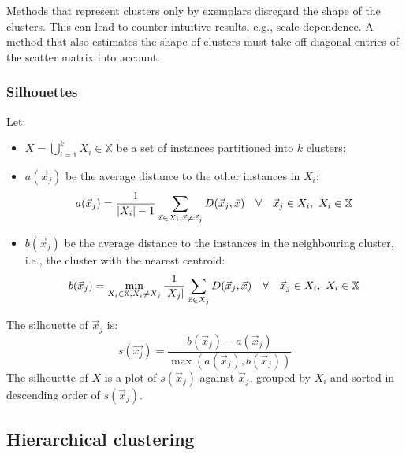 Methods that represent clusters only by exemplars disregard the shape of the
clusters.
This can lead to counter-intuitive results, e.g., scale-dependence.
A method that also estimates the shape of clusters must take off-diagonal
entries of the scatter matrix into account.

\subsubsection{Silhouettes}

\begin{dfn}
  [Silhouette]
  Let:
  \begin{itemize}
    \item $X = \bigcup_{i = 1}^{k} X_i \in \mathbb{X}$ be a set of instances
          partitioned into $k$ clusters;
    \item $a(\vec{x}_j)$ be the average distance to the other instances in $X_i$:
          \begin{equation}
            a(\vec{x}_j) =
            \frac{1}{|X_i| - 1}
            \sum_{\vec{x} \in X_i, \vec{x} \neq \vec{x}_j} D(\vec{x}_j, \vec{x})
            \quad\forall\quad
            \vec{x}_j \in X_i,\ X_i \in \mathbb{X}
          \end{equation}
    \item $b(\vec{x}_j)$ be the average distance to the instances in the
          neighbouring cluster, i.e., the cluster with the nearest centroid:
          \begin{equation}
            b(\vec{x}_j) =
            \min_{X_i \in \mathbb{X}, X_i \neq X_j}
            \frac{1}{|X_j|}
            \sum_{\vec{x} \in X_j} D(\vec{x}_j, \vec{x})
            \quad\forall\quad
            \vec{x}_j \in X_i,\ X_i \in \mathbb{X}
          \end{equation}
  \end{itemize}
  The silhouette of $\vec{x}_j$ is:
  \begin{equation}
    s(\vec{x_j}) =
    \frac{b(\vec{x}_j) - a(\vec{x}_j)}{\max(a(\vec{x}_j), b(\vec{x}_j))}
  \end{equation}
  The silhouette of $X$ is a plot of $s(\vec{x}_j)$ against
  $\vec{x}_j$, grouped by $X_i$ and sorted in descending order of
  $s(\vec{x}_j)$.
\end{dfn}

\subsection{Hierarchical clustering}

